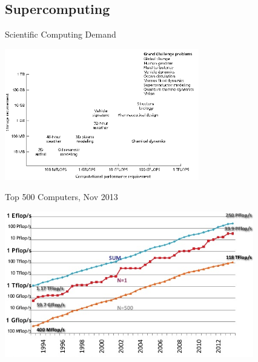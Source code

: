 \documentclass[xcolor=x11names,compress]{beamer}
\renewcommand{\(}{\begin{columns}}
\renewcommand{\)}{\end{columns}}
\newcommand{\<}[1]{\begin{column}{#1}}
\renewcommand{\>}{\end{column}}
\begin{document}
\subsection{Supercomputing}
\begin{frame}{Scientific Computing Demand}

\begin{center}
\includegraphics[height=2.25in,clip]{MemoryNeeds}
\end{center}

\end{frame}

\begin{frame}{Top 500 Computers, Nov 2013}

\begin{center}
\includegraphics[height=2.5in]{Top500-2013}
\end{center}

\end{frame}
\end{document}
